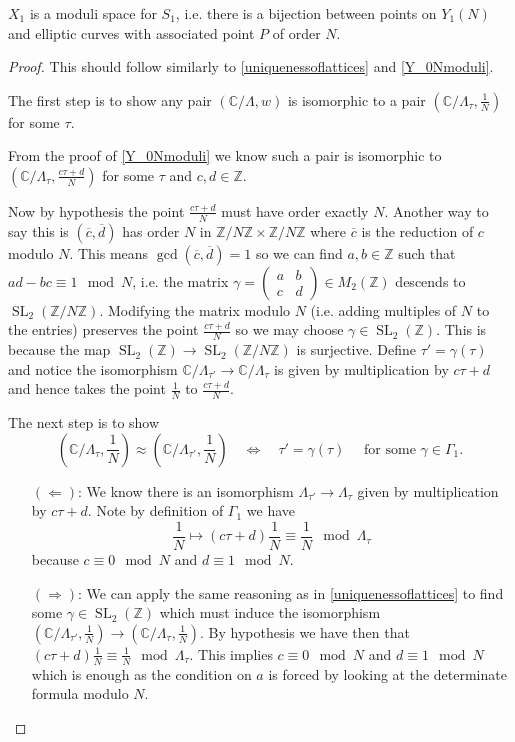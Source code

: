 \documentclass[11pt]{article}
\newcommand{\BB}[1]{\mathbb{#1}} %
\newcommand{\CC}{\BB{C}}
\newcommand{\ZZ}{\BB{Z}}
\newcommand{\SL}{\operatorname{SL}}
\theoremstyle{plain}
\theoremstyle{remark}
\begin{document}
\begin{thm}
	$X_1$ is a moduli space for $S_1$, i.e. there is a bijection between points on $Y_1(N)$ and elliptic curves with associated point $P$ of order $N$.
\end{thm}
\begin{proof}
	This should follow similarly to \autoref{uniquenessoflattices} and \autoref{Y_0Nmoduli}.

	The first step is to show any pair $\left(\CC/\Lambda,w\right)$ is isomorphic to a pair $\left(\CC/\Lambda_\tau,\frac{1}{N}\right)$ for some $\tau$.

	\noindent
	From the proof of \autoref{Y_0Nmoduli} we know such a pair is isomorphic to $\left(\CC/\Lambda_\tau,\frac{c\tau+d}{N}\right)$ for some $\tau$ and $c,d\in\ZZ$.

	Now by hypothesis the point $\frac{c\tau+d}{N}$ must have order exactly $N$. Another way to say this is $(\overline{c},\overline{d})$ has order $N$ in $\ZZ/N\ZZ\times\ZZ/N\ZZ$ where $\overline{c}$ is the reduction of $c$ modulo $N$. This means $\gcd(\overline{c},\overline{d}) = 1$ so we can find $a,b\in\ZZ$ such that $ad - bc \equiv 1 \mod{N}$, i.e. the matrix $\gamma = \begin{pmatrix}a&b\\c&d\end{pmatrix}\in M_2(\ZZ)$ descends to $\SL_2(\ZZ/N\ZZ)$. Modifying the matrix modulo $N$ (i.e. adding multiples of $N$ to the entries) preserves the point $\frac{c\tau+d}{N}$ so we may choose $\gamma\in\SL_2(\ZZ)$. This is because the map $\SL_2(\ZZ) \to \SL_2(\ZZ/N\ZZ)$ is surjective. Define $\tau' = \gamma(\tau)$ and notice the isomorphism $\CC/\Lambda_{\tau'} \to\CC/\Lambda_\tau$ is given by multiplication by $c\tau+d$ and hence takes the point $\frac{1}{N}$ to $\frac{c\tau+d}{N}$.

	The next step is to show
	$$
	\left(\CC/\Lambda_\tau,\frac{1}{N}\right) \approx \left(\CC/\Lambda_{\tau'},\frac{1}{N}\right)
	\quad\Leftrightarrow\quad
	\tau'=\gamma(\tau) \quad\text{ for some $\gamma\in\Gamma_1$}.
	$$
	\begin{enumerate}
		\item[$(\Leftarrow)$:]
			We know there is an isomorphism $\Lambda_{\tau'} \to\Lambda_{\tau}$ given by multiplication by $c\tau+d$. Note by definition of $\Gamma_1$ we have
			$$
			\frac{1}{N} \mapsto (c\tau+ d)\frac{1}{N} \equiv \frac{1}{N} \mod{\Lambda_\tau}
			$$
			because $c\equiv 0\mod{N}$ and $d\equiv 1\mod{N}$.

		\item[$(\Rightarrow)$:]
			We can apply the same reasoning as in \autoref{uniquenessoflattices} to find some $\gamma\in\SL_2(\ZZ)$ which must induce the isomorphism $\left(\CC/\Lambda_{\tau'},\frac{1}{N}\right) \to \left(\CC/\Lambda_{\tau},\frac{1}{N}\right)$. By hypothesis we have then that $(c\tau+d)\frac{1}{N} \equiv \frac{1}{N}\mod{\Lambda_{\tau}}$. This implies $c\equiv 0\mod{N}$ and $d\equiv 1\mod{N}$ which is enough as the condition on $a$ is forced by looking at the determinate formula modulo $N$.
	\end{enumerate}
\end{proof}
\end{document}
